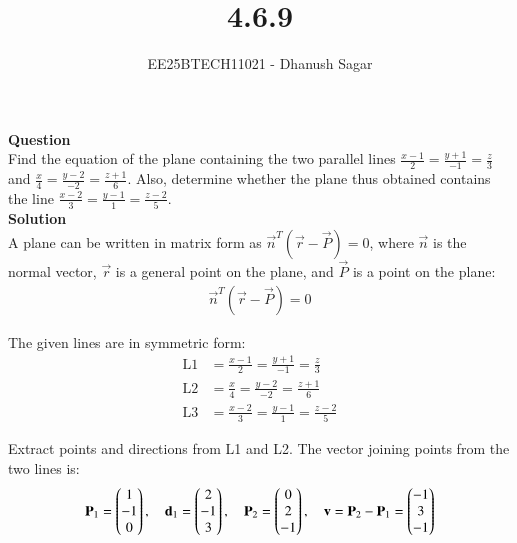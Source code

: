 \documentclass[journal]{IEEEtran}
\begin{document}



\title{4.6.9}
\author{EE25BTECH11021 - Dhanush Sagar}

{\let\newpage\relax\maketitle}

\renewcommand{\thefigure}{\theenumi}
\renewcommand{\thetable}{\theenumi}
\setlength{\intextsep}{10pt} %
\renewcommand{\thetable}{\theenumi}
\textbf{Question} \\
Find the equation of the plane containing the two parallel lines 
$\frac{x-1}{2} = \frac{y+1}{-1} = \frac{z}{3}$ and 
$\frac{x}{4} = \frac{y-2}{-2} = \frac{z+1}{6}$. 
Also, determine whether the plane thus obtained contains the line 
$\frac{x-2}{3} = \frac{y-1}{1} = \frac{z-2}{5}$.\\


\textbf{Solution} \\
\noindent A plane can be written in matrix form as 
\(\vec{n}^T(\vec{r} - \vec{P}) = 0\), where \(\vec{n}\) is the normal vector, \(\vec{r}\) is a general point on the plane, and \(\vec{P}\) is a point on the plane:
\begin{align}
\vec{n}^T(\vec{r} - \vec{P}) = 0
\end{align}

\noindent The given lines are in symmetric form:
\begin{align}
\text{L1} &= \frac{x-1}{2} = \frac{y+1}{-1} = \frac{z}{3} \\
\text{L2} &= \frac{x}{4} = \frac{y-2}{-2} = \frac{z+1}{6} \\
\text{L3} &= \frac{x-2}{3} = \frac{y-1}{1} = \frac{z-2}{5}
\end{align}

\noindent Extract points and directions from L1 and L2. The vector joining points from the two lines is:
\begin{align}
\mathbf{P}_1 = \begin{pmatrix}1\\-1\\0\end{pmatrix}, \quad \mathbf{d}_1 = \begin{pmatrix}2\\-1\\3\end{pmatrix}, \quad
\mathbf{P}_2 = \begin{pmatrix}0\\2\\-1\end{pmatrix}, \quad \mathbf{v} = \mathbf{P}_2 - \mathbf{P}_1 = \begin{pmatrix}-1\\3\\-1\end{pmatrix}
\end{align}
\end{document}
